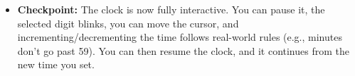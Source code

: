 \documentclass[11pt,a4paper]{article}
\begin{document}
\begin{itemize}
\begin{lstlisting}
void loop() {
  // 1. Handle Inputs
  check_all_buttons(); // This function might change our mode or cursor

  // 2. Update State
  if (current_mode == RUNNING) {
    update_time(); // The cascading logic from 4.1
  }
  
  // 3. Update Display
  mux_update(); // The multiplexer now contains the blinking logic
}
\end{lstlisting}
    \item \textbf{Checkpoint:} The clock is now fully interactive. You can pause it, the selected digit blinks, you can move the cursor, and incrementing/decrementing the time follows real-world rules (e.g., minutes don't go past 59). You can then resume the clock, and it continues from the new time you set.
\end{itemize}
\end{document}
